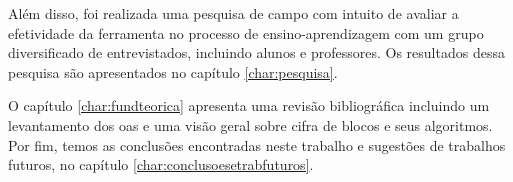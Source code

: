 Além disso, foi realizada uma pesquisa de campo com intuito de avaliar a efetividade da ferramenta no processo de ensino-aprendizagem com um grupo diversificado de entrevistados, incluindo alunos e professores. Os resultados dessa pesquisa são apresentados no capítulo \ref{char:pesquisa}.

O capítulo \ref{char:fundteorica} apresenta uma revisão bibliográfica incluindo um levantamento dos \acrshort{oas} e uma visão geral sobre cifra de blocos e seus algoritmos. Por fim, temos as conclusões encontradas neste trabalho e sugestões de trabalhos futuros, no capítulo \ref{char:conclusoesetrabfuturos}.

